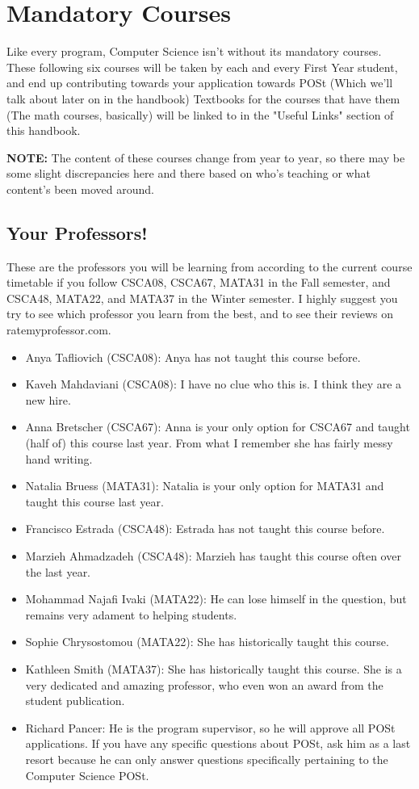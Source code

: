 \documentclass[11pt]{article}
\begin{document}
\section{Mandatory Courses}
Like every program, Computer Science isn't without its mandatory
courses. These following six courses will be taken by each and every
First Year student, and end up contributing towards your application
towards POSt (Which we'll talk about later on in the handbook) Textbooks
for the courses that have them (The math courses, basically) will
be linked to in the "Useful Links" section of this handbook.

\textbf{NOTE:} The content of these courses change from year to year,
so there may be some slight discrepancies here and there based on who's
teaching or what content's been moved around.

\subsection{Your Professors!}
These are the professors you will be learning from according to the
current course timetable if you follow CSCA08, CSCA67, MATA31 in the
Fall semester, and CSCA48, MATA22, and MATA37 in the Winter semester. I
highly suggest you try to see which professor you learn from the best,
and to see their reviews on ratemyprofessor.com.
\begin{itemize}
    \item Anya Tafliovich (CSCA08):
        Anya has not taught this course before.
    \item Kaveh Mahdaviani (CSCA08):
        I have no clue who this is. I think they are a new hire.
    \item Anna Bretscher (CSCA67):
        Anna is your only option for CSCA67 and taught (half of) this
        course last year. From what I remember she has fairly messy hand
        writing.
    \item Natalia Bruess (MATA31):
        Natalia is your only option for MATA31 and taught this course
        last year.
    \item Francisco Estrada (CSCA48):
        Estrada has not taught this course before.
    \item Marzieh Ahmadzadeh (CSCA48):
        Marzieh has taught this course often over the last year.
    \item Mohammad Najafi Ivaki (MATA22):
        He can lose himself in the question, but remains very adament to
        helping students.
    \item Sophie Chrysostomou (MATA22):
        She has historically taught this course.
    \item Kathleen Smith (MATA37):
        She has historically taught this course. She is a very dedicated and
        amazing professor, who even won an award from the student publication.
    \item Richard Pancer: 
        He is the program supervisor, so he will approve all POSt
        applications. If you have any specific questions about POSt, ask him
        as a last resort because he can only answer questions specifically
        pertaining to the Computer Science POSt.
\end{itemize}
\end{document}

